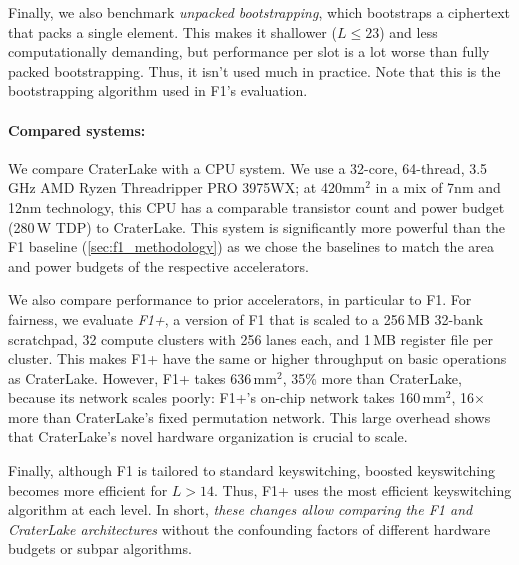 Finally, we also benchmark \emph{unpacked bootstrapping}, which bootstraps a
ciphertext that packs a single element. This makes it shallower ($L{\leq}23$)
and less computationally demanding, but performance per slot is a lot worse
than fully packed bootstrapping. Thus, it isn't used much in practice. Note
that this is the bootstrapping algorithm used in F1's evaluation.

\paragraph{Compared systems:}
We compare CraterLake with a CPU system. We use a 32-core, 64-thread, 3.5\,GHz
AMD Ryzen Threadripper PRO 3975WX; at 420mm$^2$ in a mix of 7nm and 12nm
technology, this CPU has a comparable transistor count and power budget (280\,W
TDP) to CraterLake. This system is significantly more powerful than the F1
baseline (\autoref{sec:f1_methodology}) as we chose the baselines to match the
area and power budgets of the respective accelerators.

We also compare performance to prior accelerators, in particular to
F1. For fairness, we evaluate \emph{F1+}, a version
of F1 that is scaled to a 256\,MB 32-bank scratchpad, 32 compute clusters with
256 lanes each, and 1\,MB register file per cluster. This makes F1+ have the
same or higher throughput on basic operations as CraterLake. However, F1+ takes
636\,mm$^2$, 35\% more than CraterLake, because its network scales poorly:
F1+'s on-chip network takes 160\,mm$^2$, 16$\times$ more than CraterLake's
fixed permutation network. This large overhead shows that CraterLake's novel
hardware organization is crucial to scale.

Finally, although F1 is tailored to standard keyswitching, boosted keyswitching
becomes more efficient for $L>14$. Thus, F1+ uses the most efficient
keyswitching algorithm at each level. In short, \emph{these changes allow
comparing the F1 and CraterLake architectures} without the confounding factors of
different hardware budgets or subpar algorithms.

